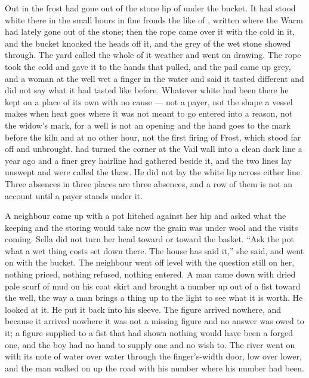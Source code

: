 Out in  the frost had gone out of the stone lip of  under the bucket. It had stood white there in the small hours in fine fronds the like of , written where the Warm had lately gone out of the stone; then the rope came over it with the cold in it, and the bucket knocked the heads off it, and the grey of the wet stone showed through. The yard called the whole of it weather and went on drawing. The rope took the cold and gave it to the hands that pulled, and the pail came up grey, and a woman at the well wet a finger in the water and said it tasted different and did not say what it had tasted like before. Whatever white had been there he kept on a place of its own with no cause --- not a payer, not the shape a vessel makes when heat goes where it was not meant to go entered into a reason, not the widow's mark, for a well is not an opening and the hand goes to the mark before the kiln and at no other hour, not the first firing of Frost, which stood far off and unbrought.  had turned the corner at the Vail wall into a clean dark line a year ago and a finer grey hairline had gathered beside it, and the two lines lay unswept and were called the thaw. He did not lay the white lip across either line. Three absences in three places are three absences, and a row of them is not an account until a payer stands under it.

A neighbour came up with a pot hitched against her hip and asked what the keeping and the storing would take now the grain was under wool and the visits coming. Sella did not turn her head toward  or toward the basket. “Ask the pot what a wet thing costs set down there. The house has said it,” she said, and went on with the bucket. The neighbour went off level with the question still on her, nothing priced, nothing refused, nothing entered. A man came down  with dried pale scurf of mud on his coat skirt and brought a number up out of a fist toward the well, the way a man brings a thing up to the light to see what it is worth. He looked at it. He put it back into his sleeve. The figure arrived nowhere, and because it arrived nowhere it was not a missing figure and no answer was owed to it; a figure supplied to a fist that had shown nothing would have been a forged one, and the boy had no hand to supply one and no wish to. The river went on with its note of water over water through the finger's-width door, low over lower, and the man walked on up the road with his number where his number had been.

